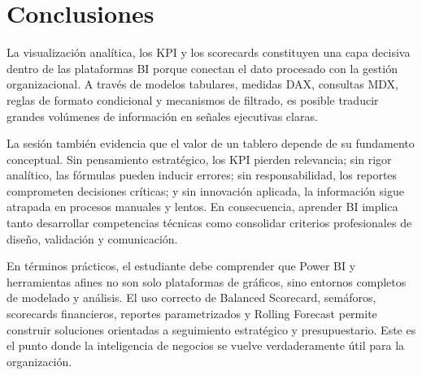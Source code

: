\documentclass[12pt]{article}
\begin{document}
\section{Conclusiones}
La visualización analítica, los KPI y los scorecards constituyen una capa decisiva dentro de las plataformas BI porque conectan el dato procesado con la gestión organizacional. A través de modelos tabulares, medidas DAX, consultas MDX, reglas de formato condicional y mecanismos de filtrado, es posible traducir grandes volúmenes de información en señales ejecutivas claras.

La sesión también evidencia que el valor de un tablero depende de su fundamento conceptual. Sin pensamiento estratégico, los KPI pierden relevancia; sin rigor analítico, las fórmulas pueden inducir errores; sin responsabilidad, los reportes comprometen decisiones críticas; y sin innovación aplicada, la información sigue atrapada en procesos manuales y lentos. En consecuencia, aprender BI implica tanto desarrollar competencias técnicas como consolidar criterios profesionales de diseño, validación y comunicación.

En términos prácticos, el estudiante debe comprender que Power BI y herramientas afines no son solo plataformas de gráficos, sino entornos completos de modelado y análisis. El uso correcto de Balanced Scorecard, semáforos, scorecards financieros, reportes parametrizados y Rolling Forecast permite construir soluciones orientadas a seguimiento estratégico y presupuestario. Este es el punto donde la inteligencia de negocios se vuelve verdaderamente útil para la organización.
\end{document}
